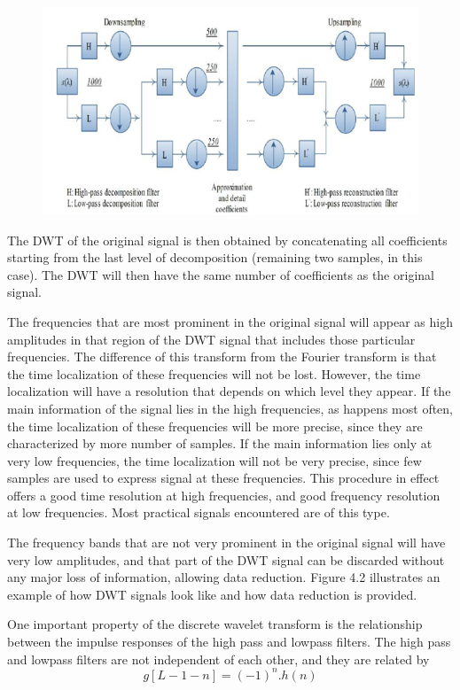 \documentclass[12pt, a4paper, twoside]{report}
\begin{document}
\begin{figure}[!h]
	\centering
	\includegraphics[width=.8\textwidth]
	{images/chapter3/subband-algorithm-3}
	\caption{}
	\label{fig:subband-algorithm-3}
\end{figure}

The DWT of the original signal is then obtained by concatenating all coefficients starting from the last level of decomposition (remaining two samples, in this case). The DWT will then have the same number of coefficients as the original signal. 
\par
The frequencies that are most prominent in the original signal will appear as high amplitudes in that region of the DWT signal that includes those particular frequencies. The difference of this transform from the Fourier transform is that the time localization of these frequencies will not be lost. However, the time localization will have a resolution that depends on which level they appear. If the main information of the signal lies in the high frequencies, as happens most often, the time localization of these frequencies will be more precise, since they are characterized by more number of samples. If the main information lies only at very low frequencies, the time localization will not be very precise, since few samples are used to express signal at these frequencies. This procedure in effect offers a good time resolution at high frequencies, and good frequency resolution at low frequencies. Most practical signals encountered are of this type. 
\par
The frequency bands that are not very prominent in the original signal will have very low amplitudes, and that part of the DWT signal can be discarded without any major loss of information, allowing data reduction. Figure 4.2 illustrates an example of how DWT signals look like and how data reduction is provided.
\par
One important property of the discrete wavelet transform is the relationship between the impulse responses of the high pass and lowpass filters. The high pass and lowpass filters are not independent of each other, and they are related by
\begin{equation}
g[L-1-n] = (-1)^n .h(n)
\end{equation}
\end{document}
